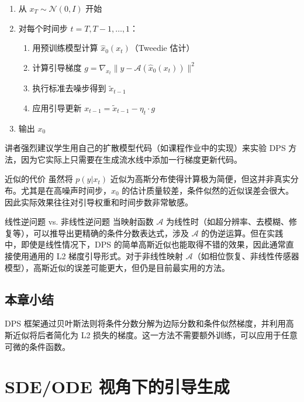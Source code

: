 \documentclass[a4paper]{article}
\begin{document}
\begin{enumerate}
    \item 从 $x_T \sim \mathcal{N}(0, I)$ 开始
    \item 对每个时间步 $t = T, T-1, \ldots, 1$：
    \begin{enumerate}
        \item 用预训练模型计算 $\hat{x}_0(x_t)$（Tweedie 估计）
        \item 计算引导梯度 $g = \nabla_{x_t} \| y - \mathcal{A}(\hat{x}_0(x_t)) \|^2$
        \item 执行标准去噪步得到 $\tilde{x}_{t-1}$
        \item 应用引导更新 $x_{t-1} = \tilde{x}_{t-1} - \eta_t \cdot g$
    \end{enumerate}
    \item 输出 $x_0$
\end{enumerate}

讲者强烈建议学生用自己的扩散模型代码（如课程作业中的实现）来实验 DPS 方法，因为它实际上只需要在生成流水线中添加一行梯度更新代码。

\begin{warningbox}{近似的代价}
虽然将 $p(y|x_t)$ 近似为高斯分布使得计算极为简便，但这并非真实分布。尤其是在高噪声时间步，$\hat{x}_0$ 的估计质量较差，条件似然的近似误差会很大。因此实际效果往往对引导权重和时间步数非常敏感。
\end{warningbox}

\begin{knowledgebox}{线性逆问题 vs. 非线性逆问题}
当映射函数 $\mathcal{A}$ 为线性时（如超分辨率、去模糊、修复等），可以推导出更精确的条件分数表达式，涉及 $\mathcal{A}$ 的伪逆运算。但在实践中，即使是线性情况下，DPS 的简单高斯近似也能取得不错的效果，因此通常直接使用通用的 L2 梯度引导形式。对于非线性映射 $\mathcal{A}$（如相位恢复、非线性传感器模型），高斯近似的误差可能更大，但仍是目前最实用的方法。
\end{knowledgebox}

\subsection{本章小结}

DPS 框架通过贝叶斯法则将条件分数分解为边际分数和条件似然梯度，并利用高斯近似将后者简化为 L2 损失的梯度。这一方法不需要额外训练，可以应用于任意可微的条件函数。

\section{SDE/ODE 视角下的引导生成}
\end{document}
